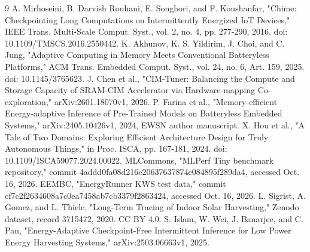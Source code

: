 \documentclass[journal,10pt]{IEEEtran}
\begin{document}
\begin{thebibliography}{9}
 A. Mirhoseini, B. Darvish Rouhani, E. Songhori, and F. Koushanfar, "Chime: Checkpointing Long Computations on Intermittently Energized IoT Devices," IEEE Trans. Multi-Scale Comput. Syst., vol. 2, no. 4, pp. 277-290, 2016. doi: 10.1109/TMSCS.2016.2550442.
 K. Akhunov, K. S. Yildirim, J. Choi, and C. Jung, "Adaptive Computing in Memory Meets Conventional Batteryless Platforms," ACM Trans. Embedded Comput. Syst., vol. 24, no. 6, Art. 159, 2025. doi: 10.1145/3765623.
 J. Chen et al., "CIM-Tuner: Balancing the Compute and Storage Capacity of SRAM-CIM Accelerator via Hardware-mapping Co-exploration," arXiv:2601.18070v1, 2026.
 P. Farina et al., "Memory-efficient Energy-adaptive Inference of Pre-Trained Models on Batteryless Embedded Systems," arXiv:2405.10426v1, 2024, EWSN author manuscript.
 X. Hou et al., "A Tale of Two Domains: Exploring Efficient Architecture Design for Truly Autonomous Things," in Proc. ISCA, pp. 167-181, 2024. doi: 10.1109/ISCA59077.2024.00022.
 MLCommons, "MLPerf Tiny benchmark repository," commit 4addd0fa08d216e20637637874e084895f289da4, accessed Oct. 16, 2026.
 EEMBC, "EnergyRunner KWS test data," commit cf7c2f2634608a7c0ea7458ab7cb3379f2863424, accessed Oct. 16, 2026.
 L. Sigrist, A. Gomez, and L. Thiele, "Long-Term Tracing of Indoor Solar Harvesting," Zenodo dataset, record 3715472, 2020. CC BY 4.0.
 S. Islam, W. Wei, J. Banarjee, and C. Pan, "Energy-Adaptive Checkpoint-Free Intermittent Inference for Low Power Energy Harvesting Systems," arXiv:2503.06663v1, 2025.
\end{thebibliography}
\end{document}

